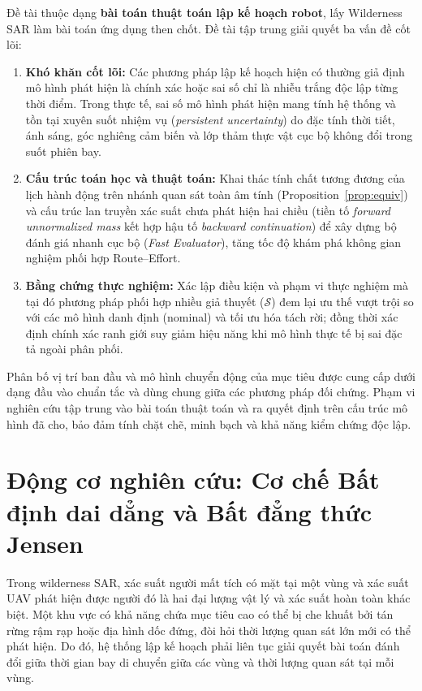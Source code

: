\documentclass[12pt,a4paper]{article}
\begin{document}
Đề tài thuộc dạng \textbf{bài toán thuật toán lập kế hoạch robot}, lấy Wilderness SAR làm bài toán ứng dụng then chốt. Đề tài tập trung giải quyết ba vấn đề cốt lõi:
\begin{enumerate}[label=\textbf{\arabic*.}]
    \item \textbf{Khó khăn cốt lõi:} Các phương pháp lập kế hoạch hiện có thường giả định mô hình phát hiện là chính xác hoặc sai số chỉ là nhiễu trắng độc lập từng thời điểm. Trong thực tế, sai số mô hình phát hiện mang tính hệ thống và tồn tại xuyên suốt nhiệm vụ (\emph{persistent uncertainty}) do đặc tính thời tiết, ánh sáng, góc nghiêng cảm biến và lớp thảm thực vật cục bộ không đổi trong suốt phiên bay.
    \item \textbf{Cấu trúc toán học và thuật toán:} Khai thác tính chất tương đương của lịch hành động trên nhánh quan sát toàn âm tính (Proposition~\ref{prop:equiv}) và cấu trúc lan truyền xác suất chưa phát hiện hai chiều (tiền tố \emph{forward unnormalized mass} kết hợp hậu tố \emph{backward continuation}) để xây dựng bộ đánh giá nhanh cục bộ (\emph{Fast Evaluator}), tăng tốc độ khám phá không gian nghiệm phối hợp Route--Effort.
    \item \textbf{Bằng chứng thực nghiệm:} Xác lập điều kiện và phạm vi thực nghiệm mà tại đó phương pháp phối hợp nhiều giả thuyết ($\mathcal{S}$) đem lại ưu thế vượt trội so với các mô hình danh định (nominal) và tối ưu hóa tách rời; đồng thời xác định chính xác ranh giới suy giảm hiệu năng khi mô hình thực tế bị sai đặc tả ngoài phân phối.
\end{enumerate}

Phân bố vị trí ban đầu và mô hình chuyển động của mục tiêu được cung cấp dưới dạng đầu vào chuẩn tắc và dùng chung giữa các phương pháp đối chứng. Phạm vi nghiên cứu tập trung vào bài toán thuật toán và ra quyết định trên cấu trúc mô hình đã cho, bảo đảm tính chặt chẽ, minh bạch và khả năng kiểm chứng độc lập.

\section{Động cơ nghiên cứu: Cơ chế Bất định dai dẳng và Bất đẳng thức Jensen}

Trong wilderness SAR, xác suất người mất tích có mặt tại một vùng và xác suất UAV phát hiện được người đó là hai đại lượng vật lý và xác suất hoàn toàn khác biệt. Một khu vực có khả năng chứa mục tiêu cao có thể bị che khuất bởi tán rừng rậm rạp hoặc địa hình dốc đứng, đòi hỏi thời lượng quan sát lớn mới có thể phát hiện. Do đó, hệ thống lập kế hoạch phải liên tục giải quyết bài toán đánh đổi giữa thời gian bay di chuyển giữa các vùng và thời lượng quan sát tại mỗi vùng.
\end{document}

